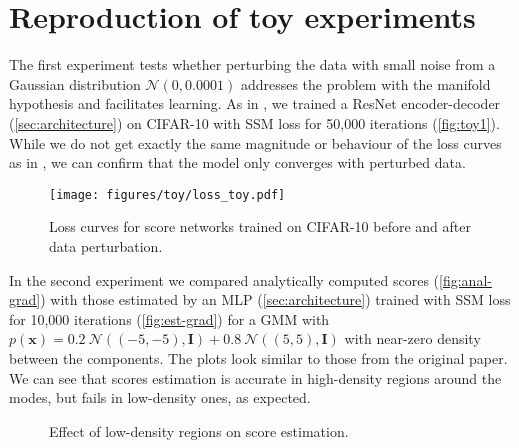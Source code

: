 \section{Reproduction of toy experiments}
\label{sec:repr-of-toy}


The first experiment tests whether perturbing the data with small noise from a Gaussian distribution $\mathcal{N}(0, 0.0001)$ addresses the problem with the manifold hypothesis and facilitates learning. %
As in \citep{ncsn-paper}, we trained a ResNet encoder-decoder (\autoref{sec:architecture}) on CIFAR-10 with SSM loss for 50,000 iterations (\autoref{fig:toy1}). While we do not get exactly the same magnitude or behaviour of the loss curves as in \cite{ncsn-paper}, we can confirm that the model only converges with perturbed data.%

\begin{figure}[h]
  \centering
  \texttt{[image: figures/toy/loss\_toy.pdf]}
     \caption{Loss curves for score networks trained on
     CIFAR-10 before and after data perturbation.}
     \label{fig:toy1}
\end{figure}

In the second experiment we compared analytically computed scores (\autoref{fig:anal-grad}) with those estimated by an MLP (\autoref{sec:architecture}) trained with SSM loss for 10,000 iterations (\autoref{fig:est-grad}) for a GMM with $p(\mathbf{x}) = 0.2\ \mathcal{N}\left((-5, -5), \mathbf{I}\right) + 0.8\ \mathcal{N}\left((5, 5), \mathbf{I}\right)$ with near-zero density between the components. The plots look similar to those from the original paper. We can see that scores estimation is accurate in high-density regions around the modes, but fails in low-density ones, as expected.

\begin{figure}[H]
  \centering
     \caption{Effect of low-density regions on score estimation.}
     \label{fig:toy2}
\end{figure}

